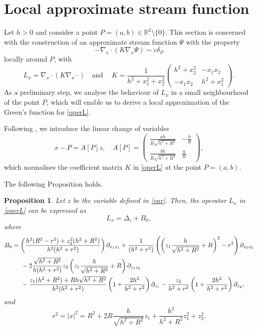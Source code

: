 \documentclass[11pt,reqno,a4paper]{amsart}
\numberwithin{equation}{section}
\newcommand{\R}{\mathbb{R}}
\newtheorem{prop}{Proposition}[section]
\begin{document}
\section{Local approximate stream function}\label{Section 2} 
Let $h>0 $ and consider a point $P=(a,b)\in\R^2\setminus\{0\}$. This section is concerned with the construction of an approximate  stream function $\Psi$ with the property 
\begin{equation}\label{ori}
-\nabla_{x}\cdot (K\nabla_{x}\Psi) \sim c\delta_P
\end{equation}
locally around $P$, with
\begin{equation}\label{operL}
L_x=\nabla_{x}\cdot (K\nabla_{x}\cdot)
\quad \text{and}\ \quad
K=\frac{1}{h^2+x_1^2+x_2^2}
\begin{pmatrix}
h^2+x_2^2 & -x_1x_2 \\
-x_1x_2 & h^2+x_1^2
\end{pmatrix}.
\end{equation}
As a preliminary step, we analyse the behaviour of $L_x$ in a small neighbourhood of the point $P$, which will enable us to derive a local approximation of the Green’s function for \eqref{operL}. 

Following \cite{MR4899797}, we introduce the linear change of variables
\begin{equation}\label{var}
x-P=A[P]z,\quad
A[P]=
\begin{pmatrix}
\frac{ah}{R\sqrt{h^2+R^2}}
& -\frac{b}{R}\\
\frac{bh}{R\sqrt{h^2+R^2}}
& \frac{a}{R}
\end{pmatrix},
\end{equation}
which normalises the coefficient matrix $K$ in \eqref{operL} at the point $P=(a,b)$.

The following Proposition holds.
\begin{prop}\label{expansionofL}
Let $z$ be the variable defined in \eqref{var}. Then, the operator $L_x$ in \eqref{operL} can be expressed as  
\[L_{x}=\Delta_{z}+B_0,\]
where
\begin{align*}
B_{0}
&= \left(\frac{h^2(R^2-r^2)+z_2^2(h^2+R^2)}{h^2(h^2+r^2)}\right)\partial_{z_1z_1}
+\frac1{(h^2+r^2)}\left(\left(z_1\frac h{\sqrt{h^2+R^2}}+R\right)^2-r^2\right)\partial_{z_2z_2} \nonumber\\
 &\hspace{5mm}- 2\frac{\sqrt{h^2+R^2}}{h(h^2+r^2)}z_2\left(z_1\frac{h}{\sqrt{h^2+R^2}}+R\right)
\partial_{z_1z_2}
 \nonumber\\
&\hspace{5mm}-\frac{z_1(h^2+R^2)+Rh\sqrt{h^2+R^2}}{h^2(h^2+r^2)}\left(1+\frac{2h^2}{h^2+r^2}\right)
\partial_{z_1}
 - \frac{z_2}{h^2+r^2}\left(1+\frac{2h^2}{h^2+r^2}\right)\partial_{z_2},
\end{align*}
and
\begin{equation}\nonumber
r^2=|x|^2=R^2+2R\frac h{\sqrt{h^2+R^2}}z_1 + \frac{h^2}{h^2+R^2}z_1^2+z_2^2.
\end{equation}
\end{prop}
\end{document}
